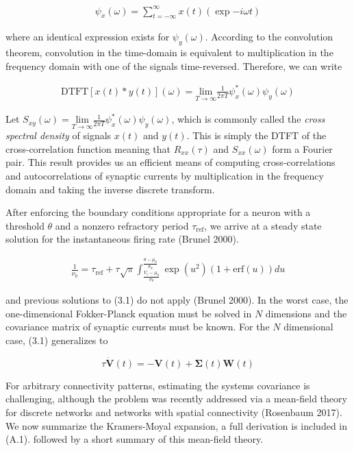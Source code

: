 \documentclass{ucetd}
\begin{document}
\begin{align}
\psi_{x}(\omega) = \sum_{t =-\infty}^{\infty}x(t)\left(\exp{-i\omega t}\right)
\end{align}

where an identical expression exists for $\psi_{y}(\omega)$. According to the convolution theorem, convolution in the time-domain is equivalent to multiplication in the frequency domain with one of the signals time-reversed. Therefore, we can write

\begin{align}
\mathrm{DTFT}[x(t) * y(t)](\omega) = \underset{T\rightarrow\infty}{\mathrm{lim}}\frac{1}{2\pi T}\psi_{x}^{*}(\omega)\psi_{y}(\omega)
\end{align}


Let $S_{xy}(\omega) = \underset{T\rightarrow\infty}{\mathrm{lim}}\frac{1}{2\pi T}\psi_{x}^{*}(\omega)\psi_{y}(\omega)$, which is commonly called the \emph{cross spectral density} of signals $x(t)$ and $y(t)$. This is simply the DTFT of the cross-correlation function meaning that $R_{xx}(\tau)$ and $S_{xx}(\omega)$ form a Fourier pair. This result provides us an efficient means of computing cross-correlations and autocorrelations of synaptic currents by multiplication in the frequency domain and taking the inverse discrete transform.

 After enforcing the boundary conditions appropriate for a neuron with a threshold $\theta$ and a nonzero refractory period $\tau_{\mathrm{ref}}$, we arrive at a steady state solution for the instantaneous firing rate (Brunel 2000). 

\begin{align}
\frac{1}{\nu_{0}} = \tau_{\mathrm{ref}} + \tau\sqrt{\pi}\int_{\frac{V_{r}-\mu_{0}}{\sigma_{0}}}^{\frac{\theta-\mu_{0}}{\sigma_{0}}} \exp(u^{2})(1+\mathrm{erf}(u))du
\end{align}

and previous solutions to (3.1) do not apply (Brunel 2000). In the worst case, the one-dimensional Fokker-Planck equation must be solved in $N$ dimensions and the covariance matrix of synaptic currents must be known. For the $N$ dimensional case, (3.1) generalizes to 

\begin{equation}
\tau\dot{\mathbf{V}}(t) = -\mathbf{V}(t) + \mathbf{\Sigma}(t)\mathbf{W}(t)
\end{equation}

For arbitrary connectivity patterns, estimating the systems covariance is challenging, although the problem was recently addressed via a mean-field theory for discrete networks and networks with spatial connectivity (Rosenbaum 2017). We now summarize the Kramers-Moyal expansion, a full derivation is included in (A.1). followed by a short summary of this mean-field theory.
\end{document}
